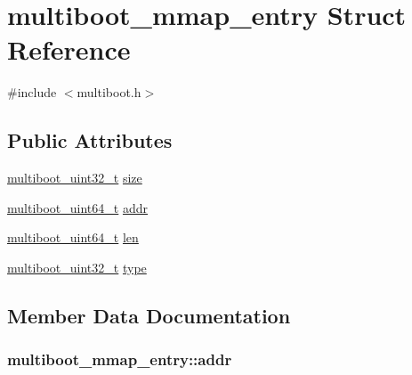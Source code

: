 \hypertarget{structmultiboot__mmap__entry}{}\section{multiboot\+\_\+mmap\+\_\+entry Struct Reference}
\label{structmultiboot__mmap__entry}


{\ttfamily \#include $<$multiboot.\+h$>$}

\subsection*{Public Attributes}
\begin{DoxyCompactItemize}
\item 
\hyperlink{multiboot_8h_a009f355da41fed4badb8a52d432f5186}{multiboot\+\_\+uint32\+\_\+t} \hyperlink{structmultiboot__mmap__entry_af10c1835051b4b08bdcdb538c1b4101d}{size}
\item 
\hyperlink{multiboot_8h_a8dfdd61648b48aa31845db590970e06a}{multiboot\+\_\+uint64\+\_\+t} \hyperlink{structmultiboot__mmap__entry_a3f76a637264b83e30967bcd808ff403c}{addr}
\item 
\hyperlink{multiboot_8h_a8dfdd61648b48aa31845db590970e06a}{multiboot\+\_\+uint64\+\_\+t} \hyperlink{structmultiboot__mmap__entry_a6bfa44919a328492fa4e3d6239a23352}{len}
\item 
\hyperlink{multiboot_8h_a009f355da41fed4badb8a52d432f5186}{multiboot\+\_\+uint32\+\_\+t} \hyperlink{structmultiboot__mmap__entry_aa6fc447c57f074d0babfe3bbb7017de9}{type}
\end{DoxyCompactItemize}


\subsection{Member Data Documentation}
\hypertarget{structmultiboot__mmap__entry_a3f76a637264b83e30967bcd808ff403c}{}
\subsubsection[{addr}]{ multiboot\+\_\+mmap\+\_\+entry\+::addr}\label{structmultiboot__mmap__entry_a3f76a637264b83e30967bcd808ff403c}
\hypertarget{structmultiboot__mmap__entry_a6bfa44919a328492fa4e3d6239a23352}{}
